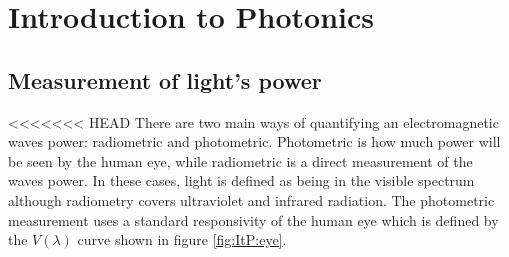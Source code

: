 \chapter{Introduction to Photonics}
\minitoc
\pagebreak
\section{Measurement of light's power}
<<<<<<< HEAD
There are two main ways of quantifying an electromagnetic waves power: radiometric and photometric.
Photometric is how much power will be seen by the human eye, while radiometric is a direct measurement of the waves power.
In these cases, light is defined as being in the visible spectrum although radiometry covers ultraviolet and infrared radiation.
The photometric measurement uses a standard responsivity of the human eye which is defined by the $V(\lambda)$ curve  shown in figure \ref{fig:ItP:eye}.
